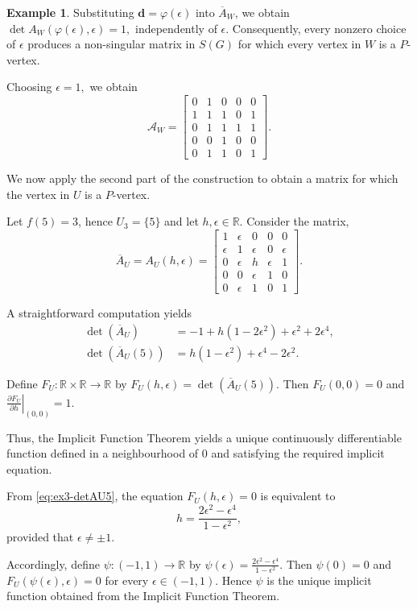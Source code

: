 \documentclass[12pt,reqno]{amsart}
\theoremstyle{plain}
\theoremstyle{definition}
\newtheorem{example}{Example}
\theoremstyle{block}
\theoremstyle{remark}
\numberwithin{equation}{section}
\begin{document}
\begin{example}
Substituting
\(
\mathbf d=\varphi(\epsilon)
\)
into \(\overline A_W\), we obtain
\(
\det A_W(\varphi(\epsilon),\epsilon)=1,
\)
independently of \(\epsilon\). Consequently, every nonzero choice of
\(\epsilon\) produces a non-singular matrix in \(S(G)\) for which every
vertex in \(W\) is a \(P\)-vertex. 

Choosing
\(
\epsilon=1,
\)
we obtain
\[
\mathcal A_W
=
\begin{bmatrix}
0&1&0&0&0\\
1&1&1&0&1\\
0&1&1&1&1\\
0&0&1&0&0\\
0&1&1&0&1
\end{bmatrix}.
\]

We now apply the second part of the construction to obtain a matrix for
which the vertex in \(U\) is a \(P\)-vertex.

Let \(f(5)=3\), hence \(U_3=\{5\}\) and let \(h,\epsilon\in\mathbb R\). Consider the matrix,
\[
\overline A_U=A_U(h,\epsilon)
=
\begin{bmatrix}
1&\epsilon&0&0&0\\
\epsilon&1&\epsilon&0&\epsilon\\
0&\epsilon&h&\epsilon&1\\
0&0&\epsilon&1&0\\
0&\epsilon&1&0&1
\end{bmatrix}.
\]

A straightforward computation yields
\begin{align}
\det(\overline A_U)
&=
-1+h(1-2\epsilon^2)+\epsilon^2+2\epsilon^4,
\label{eq:ex3-detAU}
\\
\det(\overline A_U(5))
&=
h(1-\epsilon^2)+\epsilon^4-2\epsilon^2.
\label{eq:ex3-detAU5}
\end{align}

Define
\(
F_U:\mathbb R\times\mathbb R\longrightarrow\mathbb R
\)
by
\(
F_U(h,\epsilon)
=
\det(\overline A_U(5)).
\)
Then
\(
F_U(0,0)=0
\)
and
\(
\left.
\frac{\partial F_U}{\partial h}
\right|_{(0,0)}
=1.
\)

Thus, the Implicit Function Theorem yields a unique continuously
differentiable function defined in a neighbourhood of \(0\) and
satisfying the required implicit equation.

From \eqref{eq:ex3-detAU5}, the equation
\(
F_U(h,\epsilon)=0
\)
is equivalent to
\[
h
=
\frac{2\epsilon^2-\epsilon^4}{1-\epsilon^2},
\]
provided that
\(
\epsilon\neq\pm1.
\)

Accordingly, define
\(
\psi:(-1,1)\longrightarrow\mathbb R
\)
by
\(
\psi(\epsilon)
=
\frac{2\epsilon^2-\epsilon^4}{1-\epsilon^2}.
\)
Then
\(
\psi(0)=0
\)
and
\(
F_U(\psi(\epsilon),\epsilon)=0
\)
for every \(\epsilon\in(-1,1)\). Hence \(\psi\) is the unique implicit
function obtained from the Implicit Function Theorem.


\end{example}
\end{document}
